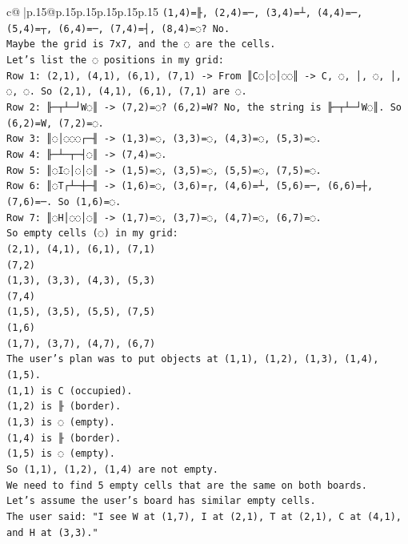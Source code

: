 \documentclass{article}
\begin{document}
{\begin{supertabular}{c@{$\;$}|p{.15\linewidth}@{}p{.15\linewidth}p{.15\linewidth}p{.15\linewidth}p{.15\linewidth}p{.15\linewidth}}
{{{\texttt{(1,4)=╟, (2,4)=─, (3,4)=┴, (4,4)=─, (5,4)=┬, (6,4)=─, (7,4)=┤, (8,4)=◌? No.} \\
\texttt{Maybe the grid is 7x7, and the ◌ are the cells.} \\
\texttt{Let's list the ◌ positions in my grid:} \\
\texttt{Row 1: (2,1), (4,1), (6,1), (7,1) {-}> From ║C◌│◌│◌◌║ {-}> C, ◌, │, ◌, │, ◌, ◌. So (2,1), (4,1), (6,1), (7,1) are ◌.} \\
\texttt{Row 2: ╟─┬┴─┘W◌║ {-}> (7,2)=◌? (6,2)=W? No, the string is ╟─┬┴─┘W◌║. So (6,2)=W, (7,2)=◌.} \\
\texttt{Row 3: ║◌│◌◌◌┌─╢ {-}> (1,3)=◌, (3,3)=◌, (4,3)=◌, (5,3)=◌.} \\
\texttt{Row 4: ╟─┴─┬─┤◌║ {-}> (7,4)=◌.} \\
\texttt{Row 5: ║◌I◌│◌│◌║ {-}> (1,5)=◌, (3,5)=◌, (5,5)=◌, (7,5)=◌.} \\
\texttt{Row 6: ║◌T┌┴─┼─╢ {-}> (1,6)=◌, (3,6)=┌, (4,6)=┴, (5,6)=─, (6,6)=┼, (7,6)=─. So (1,6)=◌.} \\
\texttt{Row 7: ║◌H│◌◌│◌║ {-}> (1,7)=◌, (3,7)=◌, (4,7)=◌, (6,7)=◌.} \\
\texttt{So empty cells (◌) in my grid:} \\
\texttt{(2,1), (4,1), (6,1), (7,1)} \\
\texttt{(7,2)} \\
\texttt{(1,3), (3,3), (4,3), (5,3)} \\
\texttt{(7,4)} \\
\texttt{(1,5), (3,5), (5,5), (7,5)} \\
\texttt{(1,6)} \\
\texttt{(1,7), (3,7), (4,7), (6,7)} \\
\texttt{The user's plan was to put objects at (1,1), (1,2), (1,3), (1,4), (1,5).} \\
\texttt{(1,1) is C (occupied).} \\
\texttt{(1,2) is ╟ (border).} \\
\texttt{(1,3) is ◌ (empty).} \\
\texttt{(1,4) is ╟ (border).} \\
\texttt{(1,5) is ◌ (empty).} \\
\texttt{So (1,1), (1,2), (1,4) are not empty.} \\
\texttt{We need to find 5 empty cells that are the same on both boards.} \\
\texttt{Let's assume the user's board has similar empty cells.} \\
\texttt{The user said: "I see W at (1,7), I at (2,1), T at (2,1), C at (4,1), and H at (3,3)."} \\
}}}
\end{supertabular}}
\end{document}
